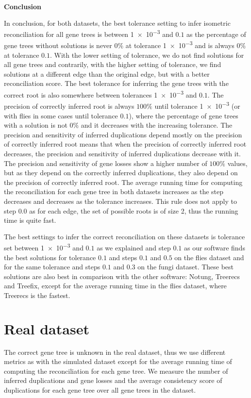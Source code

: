 \noindent \textbf{Conclusion}

In conclusion, for both datasets, the best tolerance setting to infer isometric reconciliation for all gene trees is between \num{1e-3} and $0.1$ as the percentage of gene trees without solutions is never $0\%$ at tolerance \num{1e-3} and is always $0\%$ at tolerance $0.1$. With the lower setting of tolerance, we do not find solutions for all gene trees and contrarily, with the higher setting of tolerance, we find solutions at a different edge than the original edge, but with a better reconciliation score. The best tolerance for inferring the gene trees with the correct root is also somewhere between tolerances \num{1e-3} and $0.1$. The precision of correctly inferred root is always $100\%$ until tolerance \num{1e-3} (or with flies in some cases until tolerance $0.1$), where the percentage of gene trees with a solution is not $0\%$ and it decreases with the increasing tolerance. The precision and sensitivity of inferred duplications depend mostly on the precision of correctly inferred root means that when the precision of correctly inferred root decreases, the precision and sensitivity of inferred duplications decrease with it. The precision and sensitivity of gene losses show a higher number of $100\%$ values, but as they depend on the correctly inferred duplications, they also depend on the precision of correctly inferred root. The average running time for computing the reconciliation for each gene tree in both datasets increases as the step decreases and decreases as the tolerance increases. This rule does not apply to step $0.0$ as for each edge, the set of possible roots is of size 2, thus the running time is quite fast.

The best settings to infer the correct reconciliation on these datasets is tolerance set between \num{1e-3} and $0.1$ as we explained and step $0.1$ as our software finds the best solutions for tolerance $0.1$ and steps $0.1$ and $0.5$ on the flies dataset and for the same tolerance and steps $0.1$ and $0.3$ on the fungi dataset. These best solutions are also best in comparison with the other software: Notung, Treerecs and Treefix, except for the average running time in the flies dataset, where Treerecs is the fastest.


\section{Real dataset} \label{Real_dataset}

The correct gene tree is unknown in the real dataset, thus we use different metrics as with the simulated dataset except for the average running time of computing the reconciliation for each gene tree. We measure the number of inferred duplications and gene losses and the average consistency score of duplications for each gene tree over all gene trees in the dataset.

